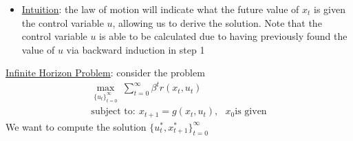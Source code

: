 \documentclass{article}
\newcommand{\tikzmark}[1]{\tikz[overlay,remember picture] \node (#1) {};}
\begin{document}
\begin{itemize}
\begin{itemize}
\begin{itemize}
            \begin{gather*}
                u_{0}^{*} = U_{0}(x_{0}^{*}), \ \ \tikzmark{a}x_{1}^{*} = g(x_{0}^{*}, u_{0}^{*}), \\
                u_{1}^{*} = U_{1}(x\tikzmark{b}_{1}^{*}), \ \ x_{2}^{*} = g(x_{1}^{*}, u_{1}^{*}), \\
                \dots \\
                u_{t}^{*} = U_{t}(x_{t}^{*}), \ \ x_{t+1}^{*} = g(x_{t}^{*}, u_{t}^{*}), \\
                \dots \\
                u_{T-1}^{*} = U_{T-1}(x_{T-1}^{*}), \ \ x_{T}^{*} = g(x_{T-1}^{*}, u_{T-1}^{*}),
                \begin{tikzpicture}[overlay,remember picture,-latex,shorten >=0.001pt,shorten <=0.001pt]
                    \draw[->,red, distance=0.25cm] (a.south) to (b.north west);
                \end{tikzpicture}
            \end{gather*}
            \item \underline{Intuition}: the law of motion will indicate what the future value of $x_{t}$ is given the control variable $u$, allowing us to derive the solution. Note that the control variable $u$ is able to be calculated due to having previously found the value of $u$ via backward induction in step 1
        \end{itemize}
    \end{itemize}
\end{itemize}
\vspace{2.5mm}
\par \underline{Infinite Horizon Problem}: consider the problem \begin{gather*}
\max_{\{u_{t}\}_{t=0}^{\infty}} \ \sum_{t=0}^{\infty} \beta^{t}r(x_{t}, u_{t}) \\
\text{subject to}: \ x_{t+1} = g(x_{t}, u_{t}), \ \ \ x_{0} \text{is given}
\end{gather*}
We want to compute the solution $\{u_{t}^{*}, x_{t+1}^{*}\}_{t=0}^{\infty}$
\end{document}
